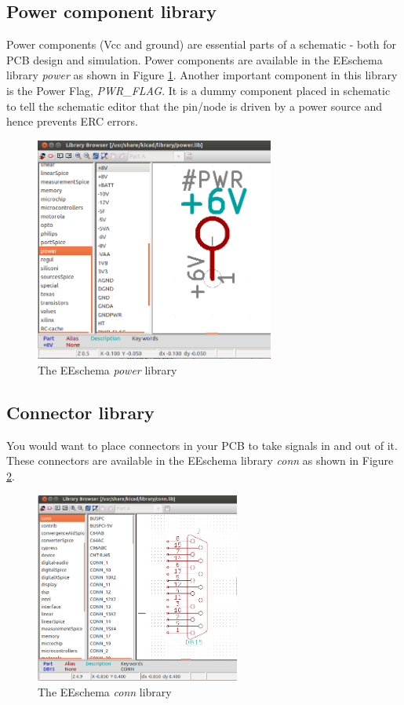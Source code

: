 \subsection{Power component library}
\label{pwr}
Power components (Vcc and ground) are essential parts of a schematic - both for PCB design and simulation. Power components are available in the EEschema library \textit{power} as shown in Figure \ref{powerlib}. Another important component in this library is the Power Flag, \textit{PWR\_FLAG}. It is a dummy component placed in schematic to tell the schematic editor that the pin/node is driven by a power source and hence prevents ERC errors. 
\begin{figure}
\centering
\includegraphics[width=0.7\textwidth]{figures/powerlib}
\caption{The EEschema \textit{power} library}
\label{powerlib}
\end{figure}
\subsection{Connector library}
\label{sconn}
You would want to place connectors in your PCB to take signals in and out of it. These connectors are available in the EEschema library \textit{conn} as shown in Figure \ref{conn}.
\begin{figure}
\centering
\includegraphics[width=0.6\textwidth]{figures/conn}
\caption{The EEschema \textit{conn} library}
\label{conn}
\end{figure}
